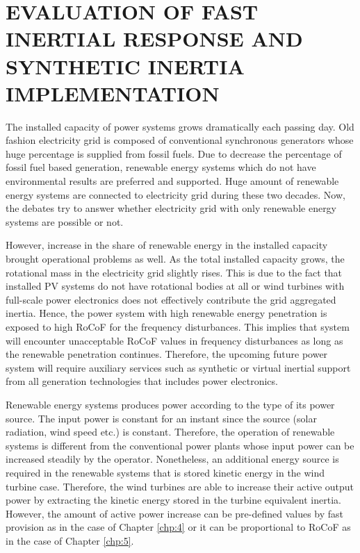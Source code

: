 \chapter{EVALUATION OF FAST INERTIAL RESPONSE AND SYNTHETIC INERTIA IMPLEMENTATION}
\label{chp:6}
The installed capacity of power systems grows dramatically each passing day. Old fashion electricity grid is composed of conventional synchronous generators whose huge percentage is supplied from fossil fuels. Due to decrease the percentage of fossil fuel based generation, renewable energy systems which do not have environmental results are preferred and supported. Huge amount of renewable energy systems are connected to electricity grid during these two decades. Now, the debates try to answer whether electricity grid with only renewable energy systems are possible or not. \par
However, increase in the share of renewable energy in the installed capacity brought operational problems as well. As the total installed capacity grows, the rotational mass in the electricity grid slightly rises. This is due to the fact that installed PV systems do not have rotational bodies at all or wind turbines with full-scale power electronics does not effectively contribute the grid aggregated inertia. Hence, the power system with high renewable energy penetration is exposed to high RoCoF for the frequency disturbances. This implies that system will encounter unacceptable RoCoF values in frequency disturbances as long as the renewable penetration continues. Therefore, the upcoming future power system will require auxiliary services such as synthetic or virtual inertial support from all generation technologies that includes power electronics. \par
Renewable energy systems produces power according to the type of its power source. The input power is constant for an instant since the source (solar radiation, wind speed etc.) is constant. Therefore, the operation of renewable systems is different from the conventional power plants whose input power can be increased steadily by the operator. Nonetheless, an additional energy source is required in the renewable systems that is stored kinetic energy in the wind turbine case. Therefore, the wind turbines are able to increase their active output power by extracting the kinetic energy stored in the turbine equivalent inertia. However, the amount of active power increase can be pre-defined values by fast provision as in the case of Chapter \ref{chp:4} or it can be proportional to RoCoF as in the case of Chapter \ref{chp:5}.
